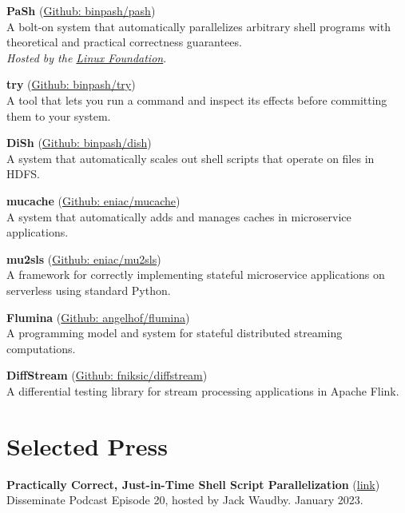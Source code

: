 \documentclass[margin]{res}
\begin{document}
\begin{resume}
\textbf{PaSh} (\href{https://github.com/binpash/pash}{Github: binpash/pash}) \\
A bolt-on system that automatically parallelizes arbitrary shell programs with theoretical and practical correctness guarantees. \\
{\em Hosted by the \href{https://www.linuxfoundation.org/press-release/linux-foundation-to-host-the-pash-project-accelerating-shell-scripting-with-automated-parallelization-for-industrial-use-cases/}{Linux Foundation}}.

\textbf{try} (\href{https://github.com/binpash/try}{Github: binpash/try}) \\
A tool that lets you run a command and inspect its effects before committing them to your system.

\textbf{DiSh} (\href{https://github.com/binpash/dish}{Github: binpash/dish}) \\
A system that automatically scales out shell scripts that operate on files in HDFS.

\textbf{mucache} (\href{https://github.com/eniac/mucache}{Github: eniac/mucache}) \\
A system that automatically adds and manages caches in microservice applications.

\textbf{mu2sls} (\href{https://github.com/eniac/mu2sls}{Github: eniac/mu2sls})  \\
A framework for correctly implementing stateful microservice applications on serverless using standard Python. 

\textbf{Flumina} (\href{https://github.com/angelhof/flumina}{Github: angelhof/flumina}) \\
A programming model and system for stateful distributed streaming computations.

\textbf{DiffStream} (\href{https://github.com/fniksic/diffstream}{Github: fniksic/diffstream}) \\
A differential testing library for stream processing applications in Apache Flink.

\section{Selected Press}
\hypertarget{sec:press}{}

\textbf{Practically Correct, Just-in-Time Shell Script Parallelization} (\href{https://disseminatepodcast.podcastpage.io/episode/konstantinos-kallas-practically-correct-just-in-time-shell-script-parallelization-20}{link}) \\
Disseminate Podcast Episode 20, hosted by Jack Waudby. January 2023.


\end{resume}
\end{document}

